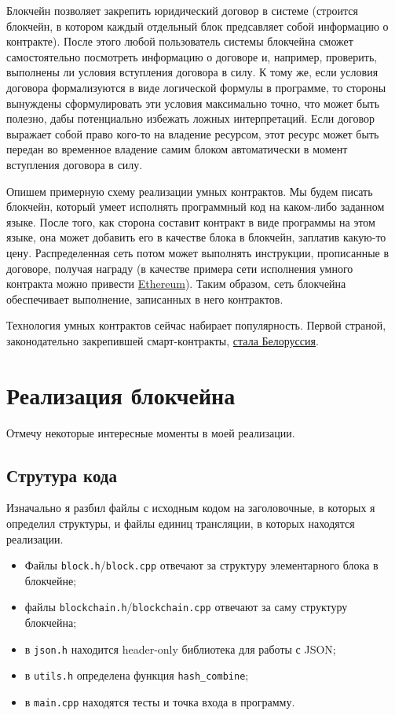 \documentclass{article}
\begin{document}
Блокчейн позволяет закрепить юридический договор в системе (строится блокчейн, в котором каждый отдельный блок предсавляет собой информацию о контракте). После этого любой пользователь системы блокчейна сможет самостоятельно посмотреть информацию о договоре и, например, проверить, выполнены ли условия вступления договора в силу. К тому же, если условия договора формализуются в виде логической формулы в программе, то стороны вынуждены сформулировать эти условия максимально точно, что может быть полезно, дабы потенциально избежать ложных интерпретаций. Если договор выражает собой право кого-то на владение ресурсом, этот ресурс может быть передан во временное владение самим блоком автоматически в момент вступления договора в силу.

Опишем примерную схему реализации умных контрактов. Мы будем писать блокчейн, который умеет исполнять программный код на каком-либо заданном языке. После того, как сторона составит контракт в виде программы на этом языке, она может добавить его в качестве блока в блокчейн, заплатив какую-то цену. Распределенная сеть потом может выполнять инструкции, прописанные в договоре, получая награду (в качестве примера сети исполнения умного контракта можно привести \href{https://ethereum.org/en/}{Ethereum}). Таким образом, сеть блокчейна обеспечивает выполнение, записанных в него контрактов.

Технология умных контрактов сейчас набирает популярность. Первой страной, законодательно закрепившей смарт-контракты, \href{https://www.belta.by/economics/view/belarus-pervoj-v-mire-zakonodatelno-zakrepila-smart-kontrakt-281784-2017/}{стала Белоруссия}.

\section{Реализация блокчейна}

Отмечу некоторые интересные моменты в моей реализации.

\subsection{Струтура кода}
Изначально я разбил файлы с исходным кодом на заголовочные, в которых я определил структуры, и файлы единиц трансляции, в которых находятся реализации.
\begin{itemize}
    \item Файлы \texttt{block.h}/\texttt{block.cpp} отвечают за структуру элементарного блока в блокчейне;
    \item файлы \texttt{blockchain.h}/\texttt{blockchain.cpp} отвечают за саму структуру блокчейна;
    \item в \texttt{json.h} находится header-only библиотека для работы с JSON;
    \item в \texttt{utils.h} определена функция \texttt{hash\_combine};
    \item в \texttt{main.cpp} находятся тесты и точка входа в программу.
\end{itemize}
\end{document}
